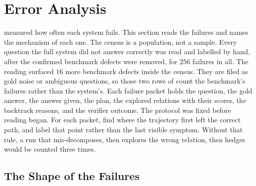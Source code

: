 %
\section{Error Analysis}\label{sec:errors}

 measured how often each system fails. This section reads the
failures and names the mechanism of each one. The census is a population, not a
sample. Every question the full system did not answer correctly was read and
labelled by hand, after the confirmed benchmark defects were removed, for $256$
failures in all. The reading surfaced $16$ more benchmark defects inside the
census. They are filed as gold noise or ambiguous questions, so those two rows
of  count the benchmark's failures rather than the system's.
Each failure packet holds the question, the gold answer, the answer given, the
plan, the explored relations with their scores, the backtrack reasons, and the
verifier outcome. The protocol was fixed before reading began. For each packet,
find where the trajectory first left the correct path, and label that point
rather than the last visible symptom. Without that rule, a run that
mis-decomposes, then explores the wrong relation, then hedges would be counted
three times.

\subsection{The Shape of the Failures}

